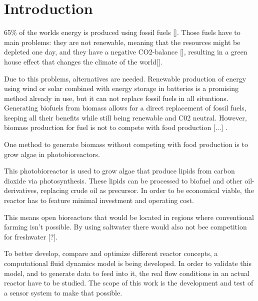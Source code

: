\chapter{Introduction}

65\% of the worlds energy is produced using fossil fuels []. Those fuels have to main problems: they are not renewable, meaning that the resources might be depleted one day, and they have a negative CO2-balance [], resulting in a green house effect that changes the climate of the world[].

Due to this problems, alternatives are needed. Renewable production of energy using wind or solar combined with energy storage in batteries is a promising method already in use, but it can not replace fossil fuels in all situations. Generating biofuels from biomass allows for a direct replacement of fossil fuels, keeping all their benefits while still being renewable and C02 neutral. However, biomass production for fuel is not to compete with food production [...] .

One method to generate biomass without competing with food production is to grow algae in photobioreactors.

This photobioreactor is used to grow algae that produce lipids from carbon dioxide via photosynthesis. These lipids can be processed to biofuel and other oil-derivatives, replacing crude oil as precursor. In order to be economical viable, the reactor has to feature minimal investment and operating cost.

This means open bioreactors that would be located in regions where conventional farming isn't possible. By using saltwater there would also not bee competition for freshwater [?].

To better develop, compare and optimize different reactor concepts, a computational fluid dynamics model is being developed. In order to validate this model, and to generate data to feed into it, the real flow conditions in an actual reactor have to be studied.
The scope of this work is the development and test of a sensor system to make that possible. 